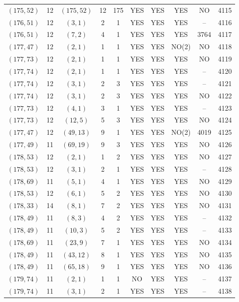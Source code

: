 \begin{longtable}{|c|c|c|c|c|c|c|c|c|c|}
$(175, 52)$ & 12 & $(175, 52)$ & 12 & 175 & YES & YES & YES & NO & 4115\\
$(176, 51)$ & 12 & $(3, 1)$ & 2 & 1 & YES & YES & YES & -- & 4116\\
$(176, 51)$ & 12 & $(7, 2)$ & 4 & 1 & YES & YES & YES & 3764 & 4117\\
$(177, 47)$ & 12 & $(2, 1)$ & 1 & 1 & YES & YES & NO(2) & NO & 4118\\
$(177, 73)$ & 12 & $(2, 1)$ & 1 & 1 & YES & YES & YES & NO & 4119\\
$(177, 74)$ & 12 & $(2, 1)$ & 1 & 1 & YES & YES & YES & -- & 4120\\
$(177, 74)$ & 12 & $(3, 1)$ & 2 & 3 & YES & YES & YES & -- & 4121\\
$(177, 74)$ & 12 & $(3, 1)$ & 2 & 3 & YES & YES & YES & NO & 4122\\
$(177, 73)$ & 12 & $(4, 1)$ & 3 & 1 & YES & YES & YES & -- & 4123\\
$(177, 73)$ & 12 & $(12, 5)$ & 5 & 3 & YES & YES & YES & NO & 4124\\
$(177, 47)$ & 12 & $(49, 13)$ & 9 & 1 & YES & YES & NO(2) & 4019 & 4125\\
$(177, 49)$ & 11 & $(69, 19)$ & 9 & 3 & YES & YES & YES & NO & 4126\\
$(178, 53)$ & 12 & $(2, 1)$ & 1 & 2 & YES & YES & YES & NO & 4127\\
$(178, 53)$ & 12 & $(3, 1)$ & 2 & 1 & YES & YES & YES & -- & 4128\\
$(178, 69)$ & 11 & $(5, 1)$ & 4 & 1 & YES & YES & YES & NO & 4129\\
$(178, 53)$ & 12 & $(6, 1)$ & 5 & 2 & YES & YES & YES & NO & 4130\\
$(178, 33)$ & 14 & $(8, 1)$ & 7 & 2 & YES & YES & YES & NO & 4131\\
$(178, 49)$ & 11 & $(8, 3)$ & 4 & 2 & YES & YES & YES & -- & 4132\\
$(178, 49)$ & 11 & $(10, 3)$ & 5 & 2 & YES & YES & YES & -- & 4133\\
$(178, 69)$ & 11 & $(23, 9)$ & 7 & 1 & YES & YES & YES & NO & 4134\\
$(178, 49)$ & 11 & $(43, 12)$ & 8 & 1 & YES & YES & YES & NO & 4135\\
$(178, 49)$ & 11 & $(65, 18)$ & 9 & 1 & YES & YES & YES & NO & 4136\\
$(179, 74)$ & 11 & $(2, 1)$ & 1 & 1 & NO & YES & YES & -- & 4137\\
$(179, 74)$ & 11 & $(3, 1)$ & 2 & 1 & YES & YES & YES & -- & 4138\\

\end{longtable}
